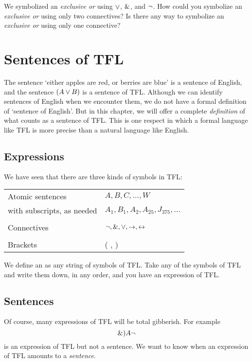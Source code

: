 \problempart
We symbolized an \emph{exclusive or} using $\vee$, $\mathbin{\&}$, and $\neg$. How could you symbolize an \emph{exclusive or} using only two connectives? Is there any way to symbolize an \emph{exclusive or} using only one connective?


\chapter{Sentences of TFL}\label{s:TFLSentences}
The sentence `either apples are red, or berries are blue' is a sentence of English, and the sentence $(A\vee B)$ is a sentence of TFL. Although we can identify sentences of English when we encounter them, we do not have a formal definition of `sentence of English'. But in this chapter, we will offer a complete \emph{definition} of what counts as a sentence of TFL. This is one respect in which a formal language like TFL is more precise than a natural language like English.


\section{Expressions}

We have seen that there are three kinds of symbols in TFL:
\begin{center}
\begin{tabular}{l l}
Atomic sentences & $A,B,C,\ldots,W$\\
with subscripts, as needed & $A_1, B_1,A_2,A_{25},J_{375},\ldots$\\
\\
Connectives & $\neg,\mathbin{\&},\vee,\rightarrow,\leftrightarrow$\\
\\
Brackets &( , )\\
\end{tabular}
\end{center}
We define an  as any string of symbols of TFL. Take any of the symbols of TFL and write them down, in any order, and you have an expression of TFL.


\section{Sentences}\label{S.sentsTFL}
Of course, many expressions of TFL will be total gibberish. For example $$\mathbin{\&})A\neg$$ is an expression of TFL but not a sentence. We want to know when an expression of TFL amounts to a \emph{sentence}. 

